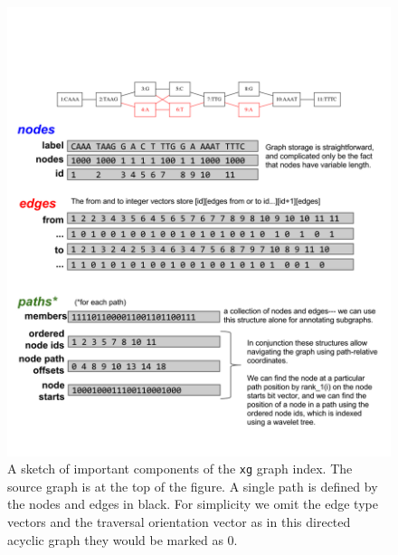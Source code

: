 \documentclass[12pt]{article}
\begin{document}
\begin{figure}[t]
\centering
\includegraphics[width=1.0\textwidth]{figures/xg}
\caption{\label{fig:xg}
  A sketch of important components of the {\tt xg} graph index.
  The source graph is at the top of the figure.
  A single path is defined by the nodes and edges in black.
  For simplicity we omit the edge type vectors and the traversal orientation vector as in this directed acyclic graph they would be marked as 0.
}
\end{figure}
\end{document}
